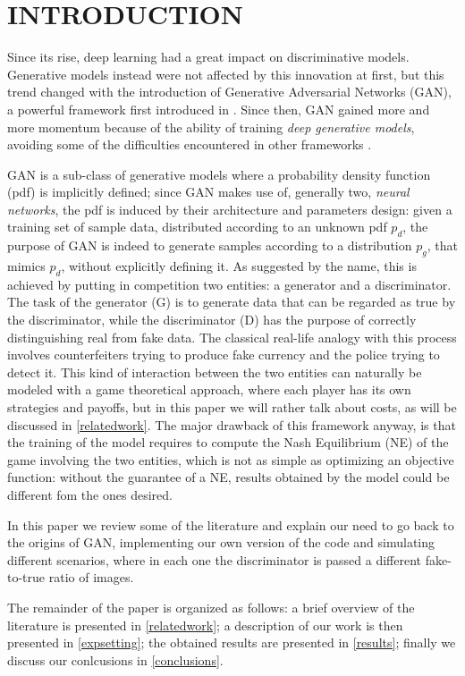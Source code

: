 \section{INTRODUCTION} \label{intro}

Since its rise, deep learning had a great impact on discriminative models. Generative models instead were not affected by this innovation at first, but this trend changed with the introduction of Generative Adversarial Networks (GAN), a powerful framework first introduced in \cite{NIPS2014_5423}. Since then, GAN gained more and more momentum because of the ability of training \textit{deep generative models}, avoiding some of the difficulties encountered in other frameworks \cite{DBLP:journals/corr/Goodfellow17}.

GAN is a sub-class of generative models where a probability density function (pdf) is implicitly defined; since GAN makes use of, generally two, \textit{neural networks}, the pdf is induced by their architecture and parameters design: given a training set of sample data, distributed according to an unknown pdf $p_d$, the purpose of GAN is indeed to generate samples according to a distribution $p_g$, that mimics $p_d$, without explicitly defining it.
As suggested by the name, this is achieved by putting in competition two entities: a generator and a discriminator. The task of the generator (G) is to generate data that can be regarded as true by the discriminator, while the discriminator (D) has the purpose of correctly distinguishing real from fake data. The classical real-life analogy with this process involves counterfeiters trying to produce fake currency and the police trying to detect it.
This kind of interaction between the two entities can naturally be modeled with a game theoretical approach, where each player has its own strategies and payoffs, but in this paper we will rather talk about costs, as will be discussed in \ref{relatedwork}. The major drawback of this framework anyway, is that the training of the model requires to compute the Nash Equilibrium (NE) of the game involving the two entities, which is not as simple as optimizing an objective function: without the guarantee of a NE, results obtained by the model could be different fom the ones desired.

In this paper we review some of the literature and explain our need to go back to the origins of GAN, implementing our own version of the code and simulating different scenarios, where in each one the discriminator is passed a different fake-to-true ratio of images.

The remainder of the paper is organized as follows: a brief overview of the literature is presented in \ref{relatedwork}; a description of our work is then presented in \ref{expsetting}; the obtained results are presented in \ref{results}; finally we discuss our conlcusions in \ref{conclusions}.
